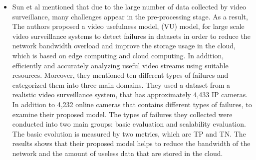 \documentclass[12pt]{article}
\begin{document}
\begin{itemize}
\item  Sun et al \cite{8807184} mentioned that due to the large number of data collected by video surveillance, many challenges appear in the pre-processing stage. As a result, The authors proposed a video usefulness model,  (VU) model, for large scale video surveillance systems to detect failures in datasets in order to reduce the network bandwidth overload and improve the storage usage in the cloud, which is based on edge computing and cloud computing. In addition, efficiently and accurately analyzing useful video streams using suitable resources. Moreover, they mentioned ten different types of failures and categorized them into three main domains. They used a dataset from a realistic video surveillance system, that has approximately 4,433 IP cameras. In addition to 4,232 online cameras that contains different types of failures, to examine their proposed model. The types of failures they collected were conducted into two main groups: basic evaluation and scalability evaluation. The basic evolution is measured by two metrics, which are TP and TN. The results shows that their proposed model helps to reduce the bandwidth of the network and the amount of useless data that are stored in the cloud.

\end{itemize}
\end{document}
